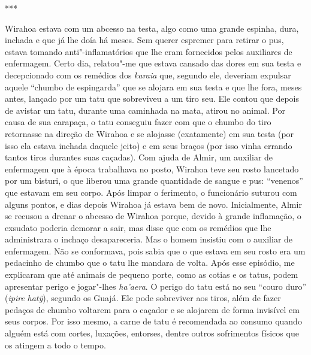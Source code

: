 \begin{center}
***
\end{center}

Wirahoa estava com um abcesso na testa, algo como uma grande espinha,
dura, inchada e que já lhe doía há meses. Sem querer espremer para
retirar o pus, estava tomando anti"-inflamatórios que lhe eram fornecidos
pelos auxiliares de enfermagem. Certo dia, relatou"-me que estava cansado
das dores em sua testa e decepcionado com os remédios dos \emph{karaia}
que, segundo ele, deveriam expulsar aquele ``chumbo de espingarda'' que se
alojara em sua testa e que lhe fora, meses antes, lançado por um tatu
que sobreviveu a um tiro seu. Ele contou que depois de avistar um tatu,
durante uma caminhada na mata, atirou no animal. Por causa de sua
carapaça, o tatu conseguiu fazer com que o chumbo do tiro retornasse na
direção de Wirahoa e se alojasse (exatamente) em sua testa (por isso ela
estava inchada daquele jeito) e em seus braços (por isso vinha errando
tantos tiros durantes suas caçadas). Com ajuda de Almir, um auxiliar de
enfermagem que à época trabalhava no posto, Wirahoa teve seu rosto
lancetado por um bisturi, o que liberou uma grande quantidade de sangue
e pus: ``venenos'' que estavam em seu corpo. Após limpar o ferimento, o
funcionário suturou com alguns pontos, e dias depois Wirahoa já estava
bem de novo. Inicialmente, Almir se recusou a drenar o abcesso de
Wirahoa porque, devido à grande inflamação, o exsudato poderia demorar a
sair, mas disse que com os remédios que lhe administrara o inchaço
desapareceria. Mas o homem insistiu com o auxiliar de enfermagem. Não se
conformava, pois sabia que o que estava em seu rosto era um pedacinho de
chumbo que o tatu lhe mandara de volta. Após esse episódio, me
explicaram que até animais de pequeno porte, como as cotias e os tatus,
podem apresentar perigo e jogar"-lhes \emph{ha'aera}. O perigo do tatu
está no seu ``couro duro'' (\emph{ipire} \emph{hatỹ}), segundo os Guajá.
Ele pode sobreviver aos tiros, além de fazer pedaços de chumbo voltarem
para o caçador e se alojarem de forma invisível em seus corpos. Por isso
mesmo, a carne de tatu é recomendada ao consumo quando alguém está com
cortes, luxações, entorses, dentre outros sofrimentos físicos que os
atingem a todo o tempo.


